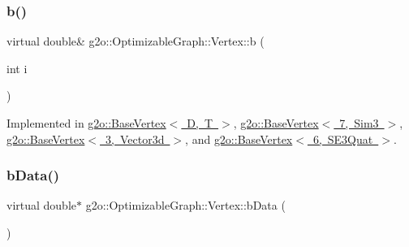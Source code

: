 \mbox{\label{classg2o_1_1_optimizable_graph_1_1_vertex_af2d92761ad2732b6e9b19bd52fa2a19b}} 
\subsubsection{\texorpdfstring{b()}{b()}\hspace{0.1cm}{\footnotesize\ttfamily [2/2]}}
{\footnotesize\ttfamily virtual double\& g2o\+::\+Optimizable\+Graph\+::\+Vertex\+::b (\begin{DoxyParamCaption}\item[{int}]{i }\end{DoxyParamCaption})\hspace{0.3cm}{\ttfamily [pure virtual]}}



Implemented in \mbox{\hyperlink{classg2o_1_1_base_vertex_a5c235369ef3fb58de65b90c8cc37d611}{g2o\+::\+Base\+Vertex$<$ D, T $>$}}, \mbox{\hyperlink{classg2o_1_1_base_vertex_a5c235369ef3fb58de65b90c8cc37d611}{g2o\+::\+Base\+Vertex$<$ 7, Sim3 $>$}}, \mbox{\hyperlink{classg2o_1_1_base_vertex_a5c235369ef3fb58de65b90c8cc37d611}{g2o\+::\+Base\+Vertex$<$ 3, Vector3d $>$}}, and \mbox{\hyperlink{classg2o_1_1_base_vertex_a5c235369ef3fb58de65b90c8cc37d611}{g2o\+::\+Base\+Vertex$<$ 6, S\+E3\+Quat $>$}}.

\mbox{\label{classg2o_1_1_optimizable_graph_1_1_vertex_a84465a61c6d322f7d64833129cc7d55a}} 
\subsubsection{\texorpdfstring{b\+Data()}{bData()}}
{\footnotesize\ttfamily virtual double$\ast$ g2o\+::\+Optimizable\+Graph\+::\+Vertex\+::b\+Data (\begin{DoxyParamCaption}{ }\end{DoxyParamCaption})\hspace{0.3cm}{\ttfamily [pure virtual]}}



